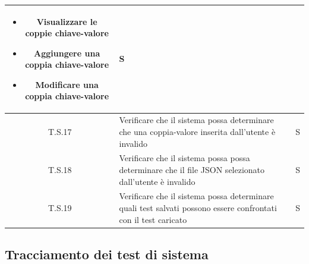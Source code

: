 \begin{tabularx}{\textwidth}{|c|X|c|}
    \begin{itemize}
        \item Visualizzare le coppie chiave-valore
        \item Aggiungere una coppia chiave-valore
        \item Modificare una coppia chiave-valore
    \end{itemize} 
    & S\\
    \hline
    \label{ts:ts17} T.S.17 & Verificare che il sistema possa determinare che una coppia-valore inserita dall’utente è invalido & S\\
    \hline
    \label{ts:ts18} T.S.18 & Verificare che il sistema possa possa determinare che il file JSON selezionato dall’utente è invalido & S\\
    \hline
    \label{ts:ts19} T.S.19 & Verificare che il sistema possa determinare quali test salvati possono essere confrontati con il test caricato & S\\
    \hline
\end{tabularx}

\subsection{Tracciamento dei test di sistema}

